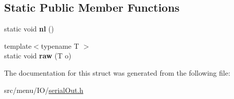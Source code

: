 \subsection*{Static Public Member Functions}
\begin{DoxyCompactItemize}
\item 
\mbox{\label{structSerialOut_a983a053fdb8a39e70fa4dae9b2001dfd}} 
static void {\bfseries nl} ()
\item 
\mbox{\label{structSerialOut_a13b599107c4c409f915a2eacf22f67d6}} 
{\footnotesize template$<$typename T $>$ }\\static void {\bfseries raw} (T o)
\end{DoxyCompactItemize}


The documentation for this struct was generated from the following file\+:\begin{DoxyCompactItemize}
\item 
src/menu/\+I\+O/\hyperlink{serialOut_8h}{serial\+Out.\+h}\end{DoxyCompactItemize}
